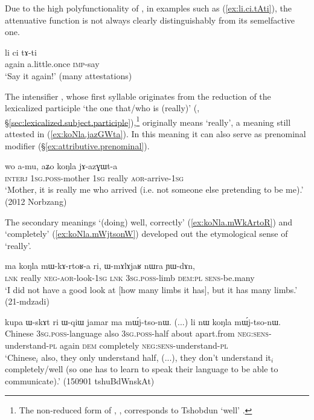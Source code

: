  Due to the high polyfunctionality of , in examples such as  (\ref{ex:li.ci.tAti}), the attenuative function is not always clearly distinguishably from its semelfactive one. 
 
 \begin{exe}
\ex \label{ex:li.ci.tAti}
\gll li ci tɤ-ti \\
again a.little.once \textsc{imp}-say \\
\glt `Say it again!' (many attestations)
 \end{exe} 
  
The intensifier , whose first syllable originates from the reduction of the lexicalized participle  `the one that/who is (really)' (, §\ref{sec:lexicalized.subject.participle}),\footnote{The non-reduced form of , , corresponds to Tshobdun  `well' \citep[55]{jackson19tshobdun}. } originally means `really', a meaning still attested in (\ref{ex:koNla.jazGWta}). In this meaning it can also serve as prenominal modifier (§\ref{ex:attributive.prenominal}).

 \begin{exe}
\ex \label{ex:koNla.jazGWta}
\gll   wo a-mu, aʑo koŋla jɤ-azɣɯt-a \\
\textsc{interj} \textsc{1sg}.\textsc{poss}-mother \textsc{1sg} really \textsc{aor}-arrive-\textsc{1sg} \\
\glt `Mother, it is really me who arrived (i.e. not someone else pretending to be me).' (2012 Norbzang)
 \end{exe} 
 
The secondary meanings `(doing) well, correctly' (\ref{ex:koNla.mWkArtoR}) and `completely' (\ref {ex:koNla.mWjtsonW})  developed out the etymological sense of `really'.
 
 \begin{exe}
\ex \label{ex:koNla.mWkArtoR}
\gll ma koŋla mɯ-kɤ-rtoʁ-a ri, ɯ-mɤlɤjaʁ nɯra ɲɯ-dɤn, \\
\textsc{lnk} really \textsc{neg}-\textsc{aor}-look-\textsc{1sg} \textsc{lnk} \textsc{3sg}.\textsc{poss}-limb \textsc{dem}:\textsc{pl} \textsc{sens}-be.many \\
\glt `I did not have a good look at [how many limbs it has], but it has many limbs.' (21-mdzadi)
 \end{exe} 
 
 
\begin{exe}
\ex \label{ex:koNla.mWjtsonW}
\gll kupa ɯ-skɤt ri ɯ-qiɯ jamar ma mɯ́j-tso-nɯ. (...) li nɯ koŋla mɯ́j-tso-nɯ. \\
Chinese \textsc{3sg}.\textsc{poss}-language also \textsc{3sg}.\textsc{poss}-half about apart.from \textsc{neg}:\textsc{sens}-understand-\textsc{pl} {  } again \textsc{dem} completely \textsc{neg}:\textsc{sens}-understand-\textsc{pl} \\
\glt `Chinese$_i$  also, they only understand half, (...), they don't understand it$_i$ completely/well (so one has to learn to speak their language to be able to communicate).' (150901 tshuBdWnskAt)
\end{exe} 

